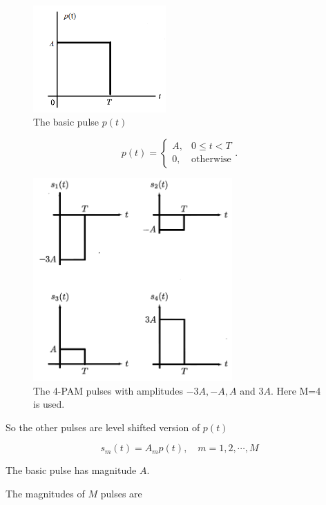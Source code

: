 \documentclass[a4paper]{article}
\numberwithin{equation}{subsection}
\begin{document}
	\begin{figure}[!hbt]
		\centering
		\includegraphics[width=2in]{../figures/fig8_5}
		\caption{The basic pulse $p(t)$}
		\label{fig:fig85}
	\end{figure}
	
	
	\begin{equation}\label{eq:pt}
	p(t) = \left\{\begin{array}{cc}
	A, & 0\leq t < T  \\
	0, & \text{otherwise}
	\end{array}   \right..
	\end{equation}
	
	\begin{figure}
		\centering
		\includegraphics[width=3in]{../figures/fig8_42}
		\caption{The 4-PAM pulses with amplitudes $-3A,-A,A$ and $3A$. Here M=4 is used.}
		\label{fig:fig8_42}
	\end{figure}
	
	
	So the other pulses are level shifted version of $p(t)$
	
	\begin{equation}\label{key}
	s_m(t)=A_m p(t), \quad m=1,2,\cdots,M
	\end{equation}
	
	The basic pulse has magnitude $A$. 
	
	The magnitudes of $M$ pulses are
	
\end{document}
